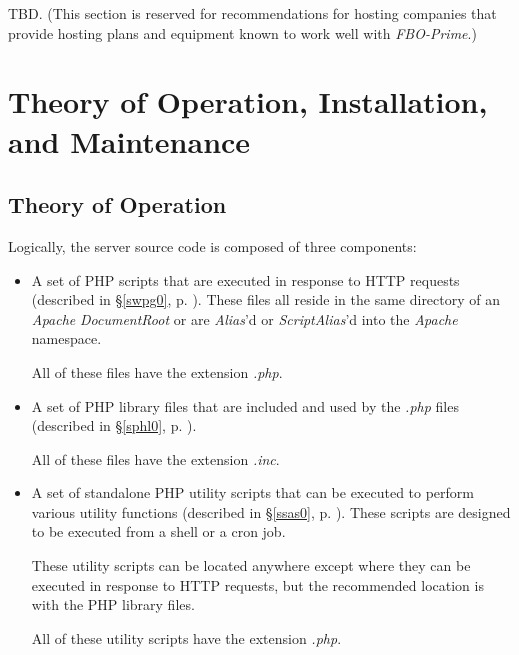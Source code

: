 \documentclass[letterpaper,10pt,titlepage]{article}
\newcommand{\productbasename}{FBO-Prime}
\begin{document}
TBD\@.  (This section is reserved for recommendations for hosting companies
that provide hosting plans and equipment known to work well with \emph{\productbasename{}}.)


\section{Theory of Operation, Installation, and Maintenance}
\label{sins0}


\subsection{Theory of Operation}
\label{sins0:sots0}

Logically, the server source code is composed of three components:

\begin{itemize}
\item A set of PHP scripts that are executed in response
      to HTTP requests (described in
      \S{}\ref{swpg0}, p. \pageref{swpg0}).  These files all reside in the same directory
      of an \emph{Apache} \emph{DocumentRoot} or are \emph{Alias}'d or
      \emph{ScriptAlias}'d into the \emph{Apache} namespace.

      All of these files have the extension \emph{.php}.
\item A set of PHP library files that are included
      and used by the \emph{.php} files
      (described in \S{}\ref{sphl0}, p. \pageref{sphl0}).

      All of these files have the extension \emph{.inc}.
\item A set of standalone PHP utility scripts that can be executed
      to perform various utility functions
      (described in \S{}\ref{ssas0}, p. \pageref{ssas0}).  These
      scripts are designed to be executed from a shell or a cron job.

      These utility scripts
      can be located anywhere except where they can be
      executed in response to HTTP requests, but the recommended location 
      is with the PHP library files.

      All of these utility scripts have the extension \emph{.php}.
\end{itemize}
\end{document}
